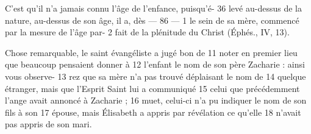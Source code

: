 	C'est qu'il n'a jamais connu l'âge de l'enfance, puisqu'é-	 
36	 	levé au-dessus de la nature, au-dessus de son âge, il a, dès	 
 	--- 86 ---	 
1	 	le sein de sa mère, commencé par la mesure de l'âge par-	 
2	 	fait de la plénitude du Christ (Éphés., IV, 13).

Chose remarquable, le saint évangéliste a jugé bon de	 
11	 	noter en premier lieu que beaucoup pensaient donner à	 
12	 	l'enfant le nom de son père Zacharie : ainsi vous observe-	 
13	 	rez que sa mère n'a pas trouvé déplaisant le nom de	 
14	 	quelque étranger, mais que l'Esprit Saint lui a communiqué	 
15	 	celui que précédemment l'ange avait annoncé à Zacharie ;	 
16	 	muet, celui-ci n'a pu indiquer le nom de son fils à son	 
17	 	épouse, mais Élisabeth a appris par révélation ce qu'elle	 
18	 	n'avait pas appris de son mari.